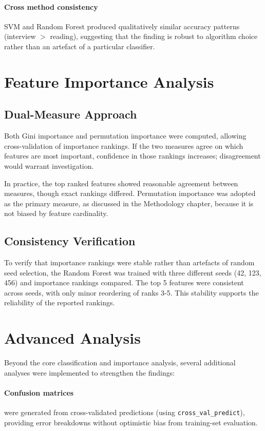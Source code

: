 \paragraph{Cross method consistency} SVM and Random Forest produced qualitatively similar accuracy patterns (interview $>$ reading), suggesting that the finding is robust to algorithm choice rather than an artefact of a particular classifier.

\section{Feature Importance Analysis}

\subsection{Dual-Measure Approach}

Both Gini importance and permutation importance were computed, allowing cross-validation of importance rankings. If the two measures agree on which features are most important, confidence in those rankings increases; disagreement would warrant investigation.

In practice, the top ranked features showed reasonable agreement between measures, though exact rankings differed. Permutation importance was adopted as the primary measure, as discussed in the Methodology chapter, because it is not biased by feature cardinality.

\subsection{Consistency Verification}

To verify that importance rankings were stable rather than artefacts of random seed selection, the Random Forest was trained with three different seeds (42, 123, 456) and importance rankings compared. The top 5 features were consistent across seeds, with only minor reordering of ranks 3-5. This stability supports the reliability of the reported rankings.

\section{Advanced Analysis}

Beyond the core classification and importance analysis, several additional analyses were implemented to strengthen the findings:

\paragraph{Confusion matrices} were generated from cross-validated predictions (using \texttt{cross\_val\_\allowbreak{}predict}), providing error breakdowns without optimistic bias from training-set evaluation.

